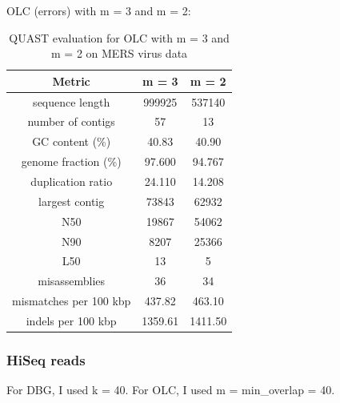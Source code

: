 \documentclass[12pt]{article}
\begin{document}
OLC (errors) with m = 3 and m = 2:

\begin{table}[h!]
\begin{center}
    \begin{tabular}{ |c|c|c| }
        \hline
        Metric               & m = 3 & m = 2 \\
        \hline
        sequence length      & 999925  & 537140   \\
        number of contigs    & 57      & 13        \\
        GC content (\%)      & 40.83  & 40.90    \\
        genome fraction (\%) & 97.600 & 94.767    \\
        duplication ratio    & 24.110  & 14.208    \\
        largest contig       & 73843  & 62932    \\
        N50                  & 19867  & 54062    \\
        N90                  & 8207  & 25366    \\
        L50                  & 13      & 5       \\
        misassemblies        & 36      & 34        \\
        mismatches per 100 kbp & 437.82 & 463.10     \\
        indels per 100 kbp   & 1359.61   & 1411.50     \\
        \hline
    \end{tabular}
    \end{center}
\caption{QUAST evaluation for OLC with m = 3 and m = 2 on MERS virus data}
\label{tab:quast_mers_olc_m3_m2}
\end{table}

\subsubsection{HiSeq reads}
For DBG, I used k = 40. For OLC, I used m = min\_overlap = 40.
\end{document}
